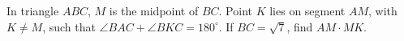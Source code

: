 In triangle $ABC$, $M$ is the midpoint of $BC$. Point $K$ lies on segment $AM$, with $K\ne M$, such that $\angle BAC+\angle BKC=180^\circ$. If $BC=\sqrt7$, find $AM\cdot MK$.

